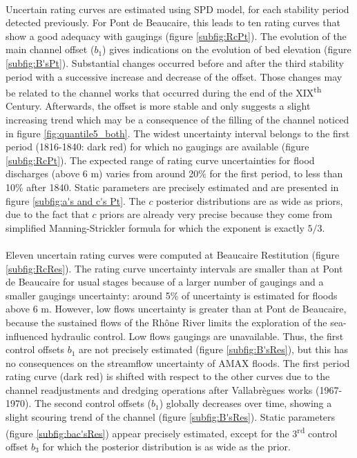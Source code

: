 \documentclass[11pt]{article}
\begin{document}
    \paragraph{}
    Uncertain rating curves are estimated using \citet{mansanarez_shift_2019} SPD model, for each stability period detected previously. For Pont de Beaucaire, this leads to ten rating curves that show a good adequacy with gaugings (figure \ref{subfig:RcPt}). The evolution of the main channel offset ($b_1$) gives indications on the evolution of bed elevation (figure \ref{subfig:B'sPt}). Substantial changes occurred before and after the third stability period with a successive increase and decrease of the offset. Those changes may be related to the channel works that occurred during the end of the XIX\textsuperscript{th} Century. Afterwards, the offset is more stable and only suggests a slight increasing trend which may be a consequence of the filling of the channel noticed in figure \ref{fig:quantile5_both}. The widest uncertainty interval belongs to the first period (1816-1840: dark red) for which no gaugings are available (figure \ref{subfig:RcPt}). The expected range of rating curve uncertainties for flood discharges (above 6 m) varies from around 20\% for the first period, to less than 10\% after 1840. Static parameters are precisely estimated and are presented in figure \ref{subfig:a's and c's Pt}. The $c$ posterior distributions are as wide as priors, due to the fact that $c$ priors are already very precise because they come from simplified Manning-Strickler formula for which the exponent is exactly $5/3$.
    
    \paragraph{}
    Eleven uncertain rating curves were computed at Beaucaire Restitution (figure \ref{subfig:RcRes}). The rating curve uncertainty intervals are smaller than at Pont de Beaucaire for usual stages because of a larger number of gaugings and a smaller gaugings uncertainty: around 5\% of uncertainty is estimated for floods above 6 m. However, low flows uncertainty is greater than at Pont de Beaucaire, because the sustained flows of the Rhône River limits the exploration of the sea-influenced hydraulic control. Low flows gaugings are unavailable. Thus, the first control offsets $b_1$ are not precisely estimated (figure \ref{subfig:B'sRes}), but this has no consequences on the streamflow uncertainty of AMAX floods. The first period rating curve (dark red) is shifted with respect to the other curves due to the channel readjustments and dredging operations after Vallabrègues works (1967-1970). The second control offsets ($b_1$) globally decreases over time, showing a slight scouring trend of the channel (figure \ref{subfig:B'sRes}). Static parameters (figure \ref{subfig:bac'sRes}) appear precisely estimated, except for the 3\textsuperscript{rd} control offset $b_3$ for which the posterior distribution is as wide as the prior. 
    
\end{document}
